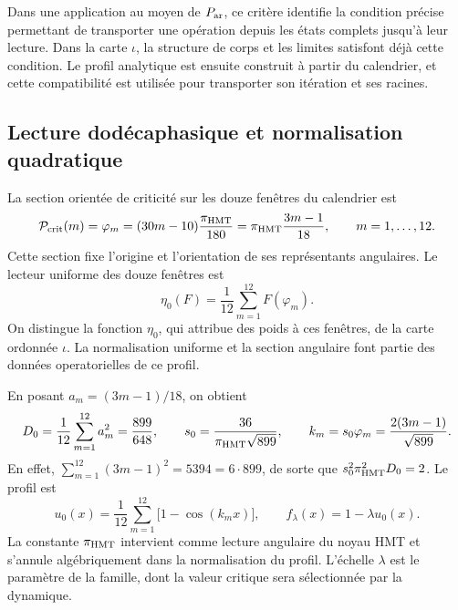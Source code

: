 Dans une application au moyen de \(P_{\rm ar}\), ce critère identifie la condition précise permettant de transporter une opération depuis les états complets jusqu’à leur lecture. Dans la carte \(\iota\), la structure de corps et les limites satisfont déjà cette condition. Le profil analytique est ensuite construit à partir du calendrier, et cette compatibilité est utilisée pour transporter son itération et ses racines.

\subsection{Lecture dodécaphasique et normalisation quadratique}
\label{hmtfg:perfil-dodecafasico}

La section orientée de criticité sur les douze fenêtres du calendrier est
\[
 \mathcal P_{\rm crit}(m)=\varphi_m
   =(30m-10)\frac{\pi_{\rm HMT}}{180}
   =\pi_{\rm HMT}\frac{3m-1}{18},\qquad m=1,\ldots,12.
\]
Cette section fixe l’origine et l’orientation de ses représentants angulaires. Le lecteur uniforme des douze fenêtres est
\[
 \eta_0(F)=\frac1{12}\sum_{m=1}^{12}F(\varphi_m).
\]
On distingue la fonction \(\eta_0\), qui attribue des poids à ces fenêtres, de la carte ordonnée \(\iota\). La normalisation uniforme et la section angulaire font partie des données operatorielles de ce profil.

En posant \(a_m=(3m-1)/18\), on obtient
\[
 D_0=\frac1{12}\sum_{m=1}^{12}a_m^2=\frac{899}{648},
 \qquad
 s_0=\frac{36}{\pi_{\rm HMT}\sqrt{899}},\qquad
 k_m=s_0\varphi_m=\frac{2(3m-1)}{\sqrt{899}}.
\]
En effet, \(\sum_{m=1}^{12}(3m-1)^2=5394=6\cdot899\), de sorte que \(s_0^2\pi_{\rm HMT}^2D_0=2\). Le profil est
\begin{equation}
 u_0(x)=\frac1{12}\sum_{m=1}^{12}\bigl[1-\cos(k_mx)\bigr],
 \qquad f_\lambda(x)=1-\lambda u_0(x).
 \label{hmtfg:perfil-familia}
\end{equation}
La constante \(\pi_{\rm HMT}\) intervient comme lecture angulaire du noyau HMT et s’annule algébriquement dans la normalisation du profil. L’échelle \(\lambda\) est le paramètre de la famille, dont la valeur critique sera sélectionnée par la dynamique.

